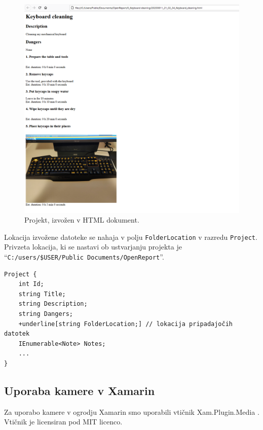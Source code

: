 \documentclass[a4paper, 12pt]{book}
\begin{document}
\begin{figure}[H]
\begin{center}
\includegraphics[width=13cm]{export_html}
\end{center}
\caption{Projekt, izvožen v HTML dokument.}
\label{export_html}
\end{figure}

Lokacija izvožene datoteke se nahaja v polju \texttt{FolderLocation} v razredu \texttt{Project}.
Privzeta lokacija, ki se nastavi ob ustvarjanju projekta je 
\\\enquote{\texttt{C:/users/\$USER/Public Documents/OpenReport}}.

\begin{Verbatim}[commandchars=+\[\]]
Project {
    int Id; 
    string Title; 
    string Description; 
    string Dangers; 
    +underline[string FolderLocation;] // lokacija pripadajočih datotek 
    IEnumerable<Note> Notes; 
    ... 
}
\end{Verbatim}






\subsection{Uporaba kamere v Xamarin}

Za uporabo kamere v ogrodju Xamarin smo uporabili vtičnik Xam.Plugin.Media \cite{xampluginmedia}.
Vtičnik je licensiran pod MIT licenco.
\end{document}
